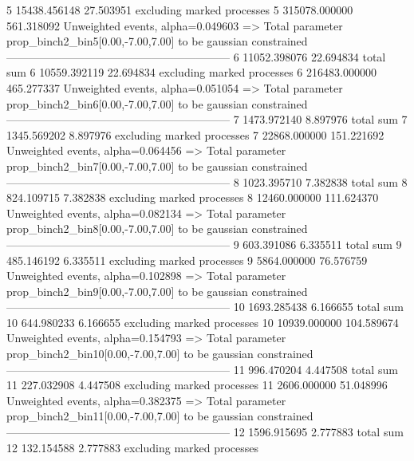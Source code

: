 5          15438.456148    27.503951       excluding marked processes    
5          315078.000000   561.318092      Unweighted events, alpha=0.049603
  => Total parameter prop_binch2_bin5[0.00,-7.00,7.00] to be gaussian constrained
------------------------------------------------------------
6          11052.398076    22.694834       total sum                     
6          10559.392119    22.694834       excluding marked processes    
6          216483.000000   465.277337      Unweighted events, alpha=0.051054
  => Total parameter prop_binch2_bin6[0.00,-7.00,7.00] to be gaussian constrained
------------------------------------------------------------
7          1473.972140     8.897976        total sum                     
7          1345.569202     8.897976        excluding marked processes    
7          22868.000000    151.221692      Unweighted events, alpha=0.064456
  => Total parameter prop_binch2_bin7[0.00,-7.00,7.00] to be gaussian constrained
------------------------------------------------------------
8          1023.395710     7.382838        total sum                     
8          824.109715      7.382838        excluding marked processes    
8          12460.000000    111.624370      Unweighted events, alpha=0.082134
  => Total parameter prop_binch2_bin8[0.00,-7.00,7.00] to be gaussian constrained
------------------------------------------------------------
9          603.391086      6.335511        total sum                     
9          485.146192      6.335511        excluding marked processes    
9          5864.000000     76.576759       Unweighted events, alpha=0.102898
  => Total parameter prop_binch2_bin9[0.00,-7.00,7.00] to be gaussian constrained
------------------------------------------------------------
10         1693.285438     6.166655        total sum                     
10         644.980233      6.166655        excluding marked processes    
10         10939.000000    104.589674      Unweighted events, alpha=0.154793
  => Total parameter prop_binch2_bin10[0.00,-7.00,7.00] to be gaussian constrained
------------------------------------------------------------
11         996.470204      4.447508        total sum                     
11         227.032908      4.447508        excluding marked processes    
11         2606.000000     51.048996       Unweighted events, alpha=0.382375
  => Total parameter prop_binch2_bin11[0.00,-7.00,7.00] to be gaussian constrained
------------------------------------------------------------
12         1596.915695     2.777883        total sum                     
12         132.154588      2.777883        excluding marked processes    
